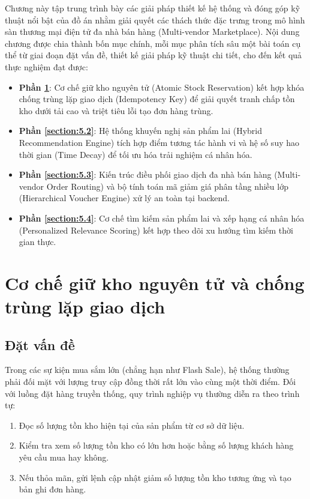 \documentclass[../DoAn.tex]{subfiles}
\begin{document}
Chương này tập trung trình bày các giải pháp thiết kế hệ thống và đóng góp kỹ thuật nổi bật của đồ án nhằm giải quyết các thách thức đặc trưng trong mô hình sàn thương mại điện tử đa nhà bán hàng (Multi-vendor Marketplace). Nội dung chương được chia thành bốn mục chính, mỗi mục phân tích sâu một bài toán cụ thể từ giai đoạn đặt vấn đề, thiết kế giải pháp kỹ thuật chi tiết, cho đến kết quả thực nghiệm đạt được:
\begin{itemize}
    \item \textbf{Phần \ref{section:5.1}}: Cơ chế giữ kho nguyên tử (Atomic Stock Reservation) kết hợp khóa chống trùng lặp giao dịch (Idempotency Key) để giải quyết tranh chấp tồn kho dưới tải cao và triệt tiêu lỗi tạo đơn hàng trùng.
    \item \textbf{Phần \ref{section:5.2}}: Hệ thống khuyến nghị sản phẩm lai (Hybrid Recommendation Engine) tích hợp điểm tương tác hành vi và hệ số suy hao thời gian (Time Decay) để tối ưu hóa trải nghiệm cá nhân hóa.
    \item \textbf{Phần \ref{section:5.3}}: Kiến trúc điều phối giao dịch đa nhà bán hàng (Multi-vendor Order Routing) và bộ tính toán mã giảm giá phân tầng nhiều lớp (Hierarchical Voucher Engine) xử lý an toàn tại backend.
    \item \textbf{Phần \ref{section:5.4}}: Cơ chế tìm kiếm sản phẩm lai và xếp hạng cá nhân hóa (Personalized Relevance Scoring) kết hợp theo dõi xu hướng tìm kiếm thời gian thực.
\end{itemize}

\section{Cơ chế giữ kho nguyên tử và chống trùng lặp giao dịch}
\label{section:5.1}

\subsection{Đặt vấn đề}
Trong các sự kiện mua sắm lớn (chẳng hạn như Flash Sale), hệ thống thường phải đối mặt với lượng truy cập đồng thời rất lớn vào cùng một thời điểm. Đối với luồng đặt hàng truyền thống, quy trình nghiệp vụ thường diễn ra theo trình tự:
\begin{enumerate}
    \item Đọc số lượng tồn kho hiện tại của sản phẩm từ cơ sở dữ liệu.
    \item Kiểm tra xem số lượng tồn kho có lớn hơn hoặc bằng số lượng khách hàng yêu cầu mua hay không.
    \item Nếu thỏa mãn, gửi lệnh cập nhật giảm số lượng tồn kho tương ứng và tạo bản ghi đơn hàng.
\end{enumerate}
\end{document}
